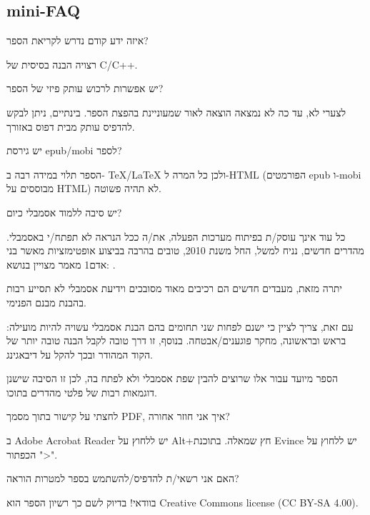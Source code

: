 \subsection*{mini-FAQ}


\par איזה ידע קודם נדרש לקריאת הספר?
\par רצויה הבנה בסיסית של C/C++.
\par יש אפשרות לרכוש עותק פיזי של הספר?
\par לצערי לא, עד כה לא נמצאה הוצאה לאור שמעוניינת בהפצת הספר. בינתיים, ניתן לבקש להדפיס עותק מבית דפוס באזורך.

\par יש גירסת epub/mobi לספר?
\par הספר תלוי במידה רבה ב- TeX/LaTeX ולכן כל המרה ל-HTML (הפורמטים epub ו-mobi מבוססים על HTML) לא תהיה פשוטה.

\par יש סיבה ללמוד אסמבלי כיום?
\par כל עוד אינך עוסק/ת בפיתוח מערכות הפעלה, את/ה ככל הנראה לא תפתח/י באסמבלי. מהדרים חדשים, נניח למשל, החל משנת 2010, טובים בהרבה בביצוע אופטימזציות מאשר בני אדם1 {מאמר מצויין בנושא: \InSqBrackets{\AgnerFog}}.

יתרה מזאת, מעבדים חדשים הם רכיבים מאוד מסובכים וידיעת אסמבלי לא תסייע רבות בהבנת מבנם הפנימי.

עם זאת, צריך לציין כי ישנם לפחות שני תחומים בהם הבנת אסמבלי עשויה להיות מועילה:
בראש ובראשונה, מחקר פוגענים/אבטחה. בנוסף, זו דרך טובה לקבל הבנה טובה יותר של הקוד המהודר ובכך להקל על דיבאגינג.

הספר מיועד עבור אלו שרוצים להבין שפת אסמבלי ולא לפתח בה, לכן זו הסיבה שישנן דוגמאות רבות של פלטי מהדרים בתוכו.

\par לחצתי על קישור בתוך מסמך PDF, איך אני חוזר אחורה?
\par ב Adobe Acrobat Reader יש ללחוץ על Alt+חץ שמאלה. בתוכנת Evince יש ללחוץ על הכפתור ">".

\par האם אני רשאי/ת להדפיס/להשתמש בספר למטרות הוראה?
\par בוודאי! בדיוק לשם כך רשיון הספר הוא Creative Commons license (CC BY-SA 4.00).

